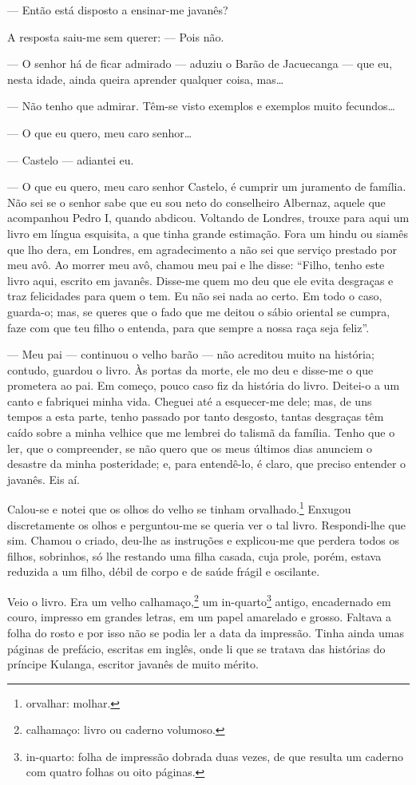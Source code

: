 --- Então está disposto a ensinar-me javanês?

A resposta saiu-me sem querer: --- Pois não.

--- O senhor há de ficar admirado --- aduziu o Barão de Jacuecanga ---
que eu, nesta idade, ainda queira aprender qualquer coisa, mas\ldots{}

--- Não tenho que admirar. Têm-se visto exemplos e exemplos muito
fecundos\ldots{}

--- O que eu quero, meu caro senhor\ldots{}

--- Castelo --- adiantei eu.

--- O que eu quero, meu caro senhor Castelo, é cumprir um juramento de
família. Não sei se o senhor sabe que eu sou neto do conselheiro
Albernaz, aquele que acompanhou Pedro I, quando abdicou. Voltando de
Londres, trouxe para aqui um livro em língua esquisita, a que tinha
grande estimação. Fora um hindu ou siamês que lho dera, em Londres, em
agradecimento a não sei que serviço prestado por meu avô. Ao morrer meu
avô, chamou meu pai e lhe disse: ``Filho, tenho este livro aqui, escrito
em javanês. Disse-me quem mo deu que ele evita desgraças e traz
felicidades para quem o tem. Eu não sei nada ao certo. Em todo o caso,
guarda-o; mas, se queres que o fado que me deitou o sábio oriental se
cumpra, faze com que teu filho o entenda, para que sempre a nossa raça
seja feliz''.

--- Meu pai --- continuou o velho barão --- não acreditou muito na
história; contudo, guardou o livro. Às portas da morte, ele mo deu e
disse-me o que prometera ao pai. Em começo, pouco caso fiz da história
do livro. Deitei-o a um canto e fabriquei minha vida. Cheguei até a
esquecer-me dele; mas, de uns tempos a esta parte, tenho passado por
tanto desgosto, tantas desgraças têm caído sobre a minha velhice que me
lembrei do talismã da família. Tenho que o ler, que o compreender, se
não quero que os meus últimos dias anunciem o desastre da minha
posteridade; e, para entendê-lo, é claro, que preciso entender o
javanês. Eis aí.

Calou-se e notei que os olhos do velho se tinham orvalhado.\footnote{orvalhar:
  molhar.} Enxugou discretamente os olhos e perguntou-me se queria ver o
tal livro. Respondi-lhe que sim. Chamou o criado, deu-lhe as instruções
e explicou-me que perdera todos os filhos, sobrinhos, só lhe restando
uma filha casada, cuja prole, porém, estava reduzida a um filho, débil
de corpo e de saúde frágil e oscilante.

Veio o livro. Era um velho calhamaço,\footnote{calhamaço: livro ou
  caderno volumoso.} um in-quarto\footnote{in-quarto: folha de impressão
  dobrada duas vezes, de que resulta um caderno com quatro folhas ou
  oito páginas.} antigo, encadernado em couro, impresso em grandes
letras, em um papel amarelado e grosso. Faltava a folha do rosto e por
isso não se podia ler a data da impressão. Tinha ainda umas páginas de
prefácio, escritas em inglês, onde li que se tratava das histórias do
príncipe Kulanga, escritor javanês de muito mérito.

